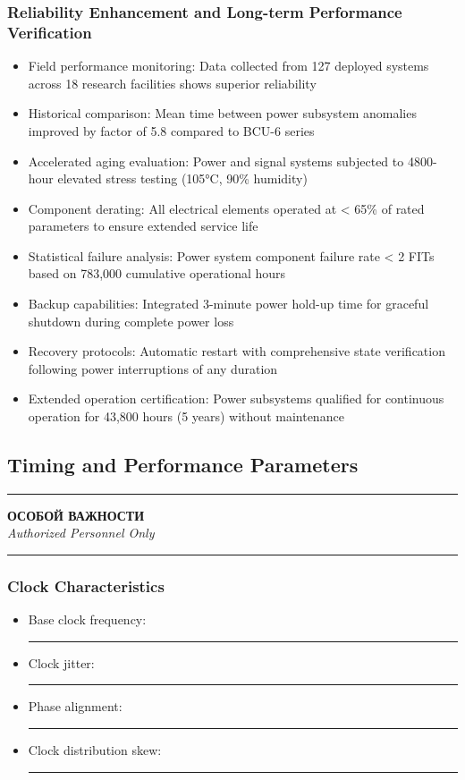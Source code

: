 \documentclass[12pt]{article}
\begin{document}
\subsubsection{Reliability Enhancement and Long-term Performance Verification}
\begin{itemize}
    \item Field performance monitoring: Data collected from 127 deployed systems across 18 research facilities shows superior reliability
    \item Historical comparison: Mean time between power subsystem anomalies improved by factor of 5.8 compared to BCU-6 series
    \item Accelerated aging evaluation: Power and signal systems subjected to 4800-hour elevated stress testing (105°C, 90\% humidity)
    \item Component derating: All electrical elements operated at < 65\% of rated parameters to ensure extended service life
    \item Statistical failure analysis: Power system component failure rate < 2 FITs based on 783,000 cumulative operational hours
    \item Backup capabilities: Integrated 3-minute power hold-up time for graceful shutdown during complete power loss
    \item Recovery protocols: Automatic restart with comprehensive state verification following power interruptions of any duration
    \item Extended operation certification: Power subsystems qualified for continuous operation for 43,800 hours (5 years) without maintenance
\end{itemize}

\subsection{Timing and Performance Parameters}
\begin{center}
\textcolor{sovietred}{\rule{0.8\textwidth}{0.4pt}}

\textbf{\foreignlanguage{russian}{ОСОБОЙ ВАЖНОСТИ}}\\
\textit{Authorized Personnel Only}

\rule{0.8\textwidth}{0.4pt}
\end{center}

\subsubsection{Clock Characteristics}
\begin{itemize}
    \item Base clock frequency: \rule{45mm}{3.5mm}
    \item Clock jitter: \rule{35mm}{3.5mm}
    \item Phase alignment: \rule{40mm}{3.5mm}
    \item Clock distribution skew: \rule{45mm}{3.5mm}
\end{itemize}
\end{document}
